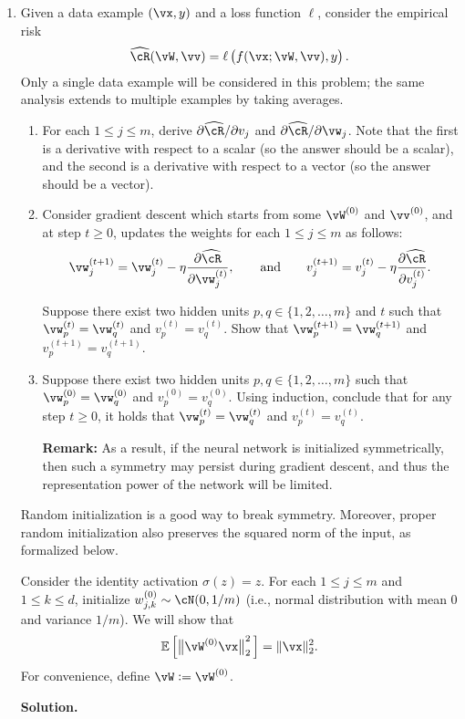 \documentclass{article}
\def\hcR{\widehat{\cR}}
\theoremstyle{definition}
\theoremstyle{remark}
\newenvironment{Q}
{%
\clearpage
\item
}
{%
\phantom{s}%
\bigskip%
\noindent\textbf{Solution.}
}
\begin{document}
\begin{enumerate}[font={\Large\bfseries},left=0pt]
\begin{Q}
    Given a data example $(\vx,y)$ and a loss function $\ell$, consider the empirical risk
    \begin{align*}
        \hcR(\vW,\vv)=\ell\del{f(\vx;\vW,\vv),y}.
    \end{align*}
    Only a single data example will be considered in this problem;
    the same analysis extends to multiple examples by taking averages.

    \begin{enumerate}
        \item For each $1\le j\le m$, derive $\partial\hcR/\partial v_j$ and $\partial\hcR/\partial \vw_j$. Note that the first is a derivative with respect to a scalar (so the answer should be a scalar), and the second is a derivative with respect to a vector (so the answer should be a vector).

        \item Consider gradient descent which starts from some $\vW^{(0)}$ and $\vv^{(0)}$, and at step $t\ge0$, updates the weights for each $1\le j\le m$ as follows:
        \begin{align*}
            \vw_j^{(t+1)}=\vw_j^{(t)}-\eta \frac{\partial\hcR}{\partial \vw_j^{(t)}},\qquad \mathrm{and}\qquad v_j^{(t+1)}=v_j^{(t)}-\eta \frac{\partial\hcR}{\partial v_j^{(t)}}.
        \end{align*}

        Suppose there exist two hidden units $p,q\in\{1,2,\ldots,m\}$ and $t$ such that $\vw_p^{(t)}=\vw_q^{(t)}$ and $v_p^{(t)}=v_q^{(t)}$.
        Show that $\vw_p^{(t+1)}=\vw_q^{(t+1)}$ and $v_p^{(t+1)}=v_q^{(t+1)}$.

        \item 
        Suppose there exist two hidden units $p,q\in\{1,2,\ldots,m\}$ such that $\vw_p^{(0)}=\vw_q^{(0)}$ and $v_p^{(0)}=v_q^{(0)}$.
        Using induction, conclude that for any step $t\ge0$, it holds that $\vw_p^{(t)}=\vw_q^{(t)}$ and $v_p^{(t)}=v_q^{(t)}$.

        \textbf{Remark:} As a result, if the neural network is initialized symmetrically, then such a symmetry may persist during gradient descent, and thus the representation power of the network will be limited.
    \end{enumerate}
    Random initialization is a good way to break symmetry. Moreover, proper random initialization also preserves the squared norm of the input, as formalized below.

    Consider the identity activation $\sigma(z)=z$. For each $1\le j\le m$ and $1\le k\le d$, initialize $w_{j,k}^{(0)}\sim\cN(0,1/m)$ (i.e., normal distribution with mean $0$ and variance $1/m$).
    We will show that
    \begin{align*}
        \mathbb{E}\sbr[2]{\,\enVert[1]{\vW^{(0)}\vx}_2^2\,}=\|\vx\|_2^2.
    \end{align*}
    For convenience, define $\vW := \vW^{(0)}$.


\end{Q}
\end{enumerate}
\end{document}
